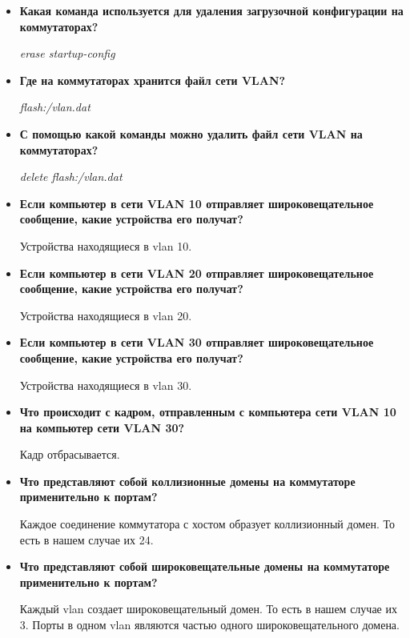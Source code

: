 \documentclass[a4paper,14pt]{extarticle}
\begin{document}
\begin{enumerate}
\begin{itemize}
            \item \textbf{Какая команда используется для удаления загрузочной конфигурации на коммутаторах?}\par
            \emph{erase startup-config}

            \item \textbf{Где на коммутаторах хранится файл сети VLAN?}\par
            \emph{flash:/vlan.dat}

            \item \textbf{С помощью какой команды можно удалить файл сети VLAN на коммутаторах?}\par
            \emph{delete flash:/vlan.dat}

            \item \textbf{Если компьютер в сети VLAN 10 отправляет широковещательное сообщение, какие устройства его получат?}\par
               Устройства находящиеся в vlan 10. 

            \item \textbf{Если компьютер в сети VLAN 20 отправляет широковещательное сообщение, какие устройства его получат?}\par
               Устройства находящиеся в vlan 20. 

            \item \textbf{Если компьютер в сети VLAN 30 отправляет широковещательное сообщение, какие устройства его получат?}\par
               Устройства находящиеся в vlan 30. 

            \item \textbf{Что происходит с кадром, отправленным с компьютера сети VLAN 10 на компьютер сети VLAN 30?}\par
                Кадр отбрасывается.

            \item \textbf{Что представляют собой коллизионные домены на коммутаторе применительно к портам?}\par
                Каждое соединение коммутатора с хостом образует коллизионный домен. То есть в нашем случае их 24.

            \item \textbf{Что представляют собой широковещательные домены на коммутаторе применительно к портам?}\par
                Каждый vlan создает широковещательный домен. То есть в нашем случае их 3. Порты в одном vlan являются частью одного широковещательного домена.


\end{itemize}
\end{enumerate}
\end{document}
